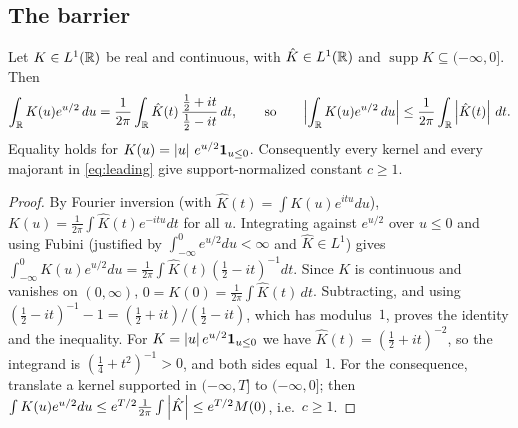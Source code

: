 \subsection{The barrier}
\begin{proposition}[informal]\label{prop:barrier}
Let $K\in L^1(\mathbb{R})$ be real and continuous, with $\hat K\in L^1(\mathbb{R})$ and $\operatorname{supp}K\subseteq(-\infty,0]$. Then
\[
  \int_{\mathbb{R}} K(u)e^{u/2}\,du=\frac1{2\pi}\int_{\mathbb{R}}\hat K(t)\,\frac{\frac12+it}{\frac12-it}\,dt,
  \qquad\text{so}\qquad
  \Bigl\lvert\int_{\mathbb{R}} K(u)e^{u/2}\,du\Bigr\rvert\le\frac1{2\pi}\int_{\mathbb{R}}\left\lvert \hat K(t) \right\rvert\,dt .
\]
Equality holds for $K(u)=\left\lvert u \right\rvert\,e^{u/2}\mathbf 1_{u\le0}$. Consequently every kernel and every majorant in
\eqref{eq:leading} give support-normalized constant $c\ge1$.
\end{proposition}
\begin{proof}
By Fourier inversion (with $\hat K(t)=\int K(u)e^{itu}du$), $K(u)=\frac1{2\pi}\int\hat K(t)e^{-itu}dt$ for all $u$. Integrating against $e^{u/2}$ over $u\le0$ and
using Fubini (justified by $\int_{-\infty}^0e^{u/2}du<\infty$ and $\hat K\in L^1$) gives
$\int_{-\infty}^0K(u)e^{u/2}du=\frac1{2\pi}\int\hat K(t)(\frac12-it)^{-1}dt$. Since $K$ is continuous and vanishes on
$(0,\infty)$, $0=K(0)=\frac1{2\pi}\int\hat K(t)\,dt$. Subtracting, and using
$(\frac12-it)^{-1}-1=(\frac12+it)/(\frac12-it)$, which has modulus~$1$, proves the identity and the inequality. For
$K=\left\lvert u \right\rvert e^{u/2}\mathbf 1_{u\le0}$ we have $\hat K(t)=(\frac12+it)^{-2}$, so the integrand is $(\frac14+t^2)^{-1}>0$, and both sides
equal~$1$. For the consequence, translate a kernel supported in $(-\infty,T]$ to $(-\infty,0]$; then
$\int K(u)e^{u/2}du\le e^{T/2}\frac1{2\pi}\int\left\lvert \hat K \right\rvert\le e^{T/2}M(0)$, i.e.\ $c\ge1$.
\end{proof}

